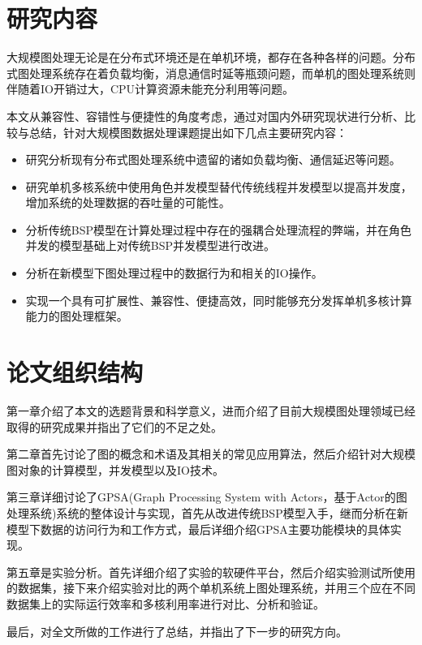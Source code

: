 \section{研究内容}
大规模图处理无论是在分布式环境还是在单机环境，都存在各种各样的问题。分布式图处理系统存在着负载均衡，消息通信时延等瓶颈问题，而单机的图处理系统则伴随着IO开销过大，CPU计算资源未能充分利用等问题。

本文从兼容性、容错性与便捷性的角度考虑，通过对国内外研究现状进行分析、比较与总结，针对大规模图数据处理课题提出如下几点主要研究内容：
\begin{itemize}
\item 研究分析现有分布式图处理系统中遗留的诸如负载均衡、通信延迟等问题。
\item 研究单机多核系统中使用角色并发模型替代传统线程并发模型以提高并发度，增加系统的处理数据的吞吐量的可能性。
\item 分析传统BSP模型在计算处理过程中存在的强耦合处理流程的弊端，并在角色并发的模型基础上对传统BSP并发模型进行改进。
\item 分析在新模型下图处理过程中的数据行为和相关的IO操作。
\item 实现一个具有可扩展性、兼容性、便捷高效，同时能够充分发挥单机多核计算能力的图处理框架。
\end{itemize}

\section{论文组织结构}

第一章介绍了本文的选题背景和科学意义，进而介绍了目前大规模图处理领域已经取得的研究成果并指出了它们的不足之处。

第二章首先讨论了图的概念和术语及其相关的常见应用算法，然后介绍针对大规模图对象的计算模型，并发模型以及IO技术。

第三章详细讨论了GPSA(Graph Processing System with Actors，基于Actor的图处理系统)系统的整体设计与实现，首先从改进传统BSP模型入手，继而分析在新模型下数据的访问行为和工作方式，最后详细介绍GPSA主要功能模块的具体实现。

第五章是实验分析。首先详细介绍了实验的软硬件平台，然后介绍实验测试所使用的数据集，接下来介绍实验对比的两个单机系统上图处理系统，并用三个应在不同数据集上的实际运行效率和多核利用率进行对比、分析和验证。

最后，对全文所做的工作进行了总结，并指出了下一步的研究方向。
